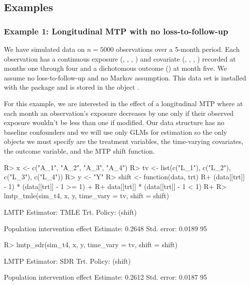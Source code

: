 \documentclass[]{jss}
\begin{document}
\hypertarget{examples}{%
\subsection{Examples}\label{examples}}

\hypertarget{example-1-longitudinal-mtp-with-no-loss-to-follow-up}{%
\subsubsection{Example 1: Longitudinal MTP with no
loss-to-follow-up}\label{example-1-longitudinal-mtp-with-no-loss-to-follow-up}}

We have simulated data on \(n = 5000\) observations over a 5-month
period. Each observation has a continuous exposure (,
, , ) and covariate (,
, , ) recorded at months one through four
and a dichotomous outcome () at month five. We assume no
loss-to-follow-up and no Markov assumption. This data set is installed
with the package and is stored in the object .

For this example, we are interested in the effect of a longitudinal MTP
where at each month an observation's exposure decreases by one only if
their observed exposure wouldn't be less than one if modified. Our data
structure has no baseline confounders and we will use only GLMs for
estimation so the only objects we must specify are the treatment
variables, the time-varying covariates, the outcome variable, and the
MTP shift function.

\begin{CodeChunk}

\begin{CodeInput}
R> x <- c("A_1", "A_2", "A_3", "A_4")
R> tv <- list(c("L_1"), c("L_2"), c("L_3"), c("L_4"))
R> y <- "Y"
R> shift <- function(data, trt) {
R+   (data[[trt]] - 1) * (data[[trt]] - 1 >= 1) + 
R+     data[[trt]] * (data[[trt]] - 1 < 1)
R+ }
R> lmtp_tmle(sim_t4, x, y, time_vary = tv, shift = shift)
\end{CodeInput}

\begin{CodeOutput}
LMTP Estimator: TMLE
   Trt. Policy: (shift)

Population intervention effect
      Estimate: 0.2648
    Std. error: 0.0189
        95%
\end{CodeOutput}

\begin{CodeInput}
R> lmtp_sdr(sim_t4, x, y, time_vary = tv, shift = shift)
\end{CodeInput}

\begin{CodeOutput}
LMTP Estimator: SDR
   Trt. Policy: (shift)

Population intervention effect
      Estimate: 0.2612
    Std. error: 0.0187
        95%
\end{CodeOutput}

\end{CodeChunk}
\end{document}
